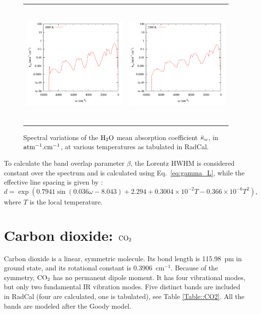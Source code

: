 \begin{figure}[p]
\begin{tabular*}{\textwidth}{l@{\extracolsep{\fill}}r}
\includegraphics[height=2.5in]{Figures/H2O_2000K.png} &
\includegraphics[height=2.5in]{Figures/H2O_2500K.png}
\end{tabular*}
\caption{Spectral variations of the $\rm H_2O$ mean absorption coefficient $\bar{\kappa}_{\omega}$, in $\rm atm^{-1}.cm^{-1}$, at various temperatures as tabulated in RadCal.\label{fig:H2O_300-2500K}}
\end{figure}

To calculate the band overlap parameter $\beta$, the Lorentz HWHM is considered constant over the spectrum and is calculated using Eq.~\ref{eq:gamma_L}, while the effective line spacing is given by \cite{Ludwig1973}:
\begin{equation}
 d = \exp\left(0.7941 \sin\left(0.036 \omega- 8.043\right) + 2.294 + 0.3004 \times 10^{-2} T - 0.366 \times 10^{-6} T^2\right),
\end{equation}
where $T$ is the local temperature.


\clearpage

\section{Carbon dioxide: $\rm CO_2$}

Carbon dioxide is a linear, symmetric molecule. Its bond length is 115.98~pm in ground state, and its rotational constant is 0.3906~cm$^{-1}$. Because of the symmetry, $\rm CO_2$ has no permanent dipole moment. It has four vibrational modes, but only two fundamental IR vibration modes. Five distinct bands are included in RadCal (four are calculated, one is tabulated), see Table \ref{Table::CO2}. All the bands are modeled after the Goody model.

